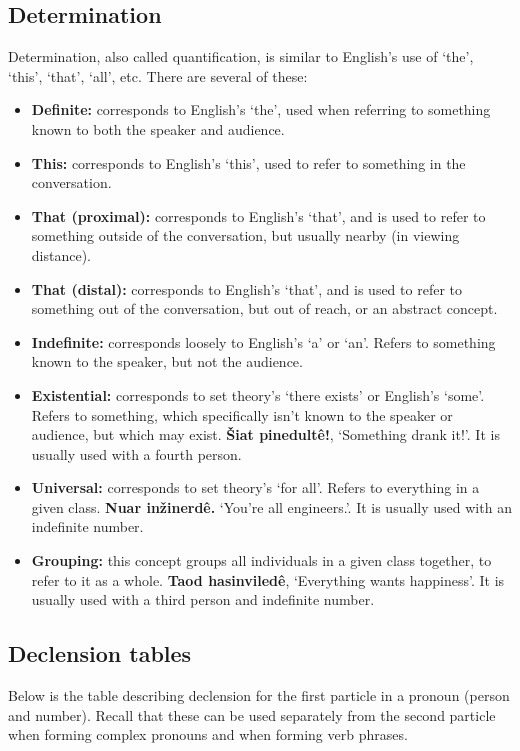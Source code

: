 \documentclass[12pt]{report}
\begin{document}
\subsection{Determination}
Determination, also called quantification, is similar to English's use of `the', `this', `that', `all', etc. There are several of these:

\begin{itemize}
\item \textbf{Definite:} corresponds to English's `the', used when referring to something known to both the speaker and audience.
\item \textbf{This:} corresponds to English's `this', used to refer to something in the conversation.
\item \textbf{That (proximal):} corresponds to English's `that', and is used to refer to something outside of the conversation, but usually nearby (in viewing distance).
\item \textbf{That (distal):} corresponds to English's `that', and is used to refer to something out of the conversation, but out of reach, or an abstract concept.
\item \textbf{Indefinite:} corresponds loosely to English's `a' or `an'. Refers to something known to the speaker, but not the audience.
\item \textbf{Existential:} corresponds to set theory's `there exists' or English's `some'. Refers to something, which specifically isn't known to the speaker or audience, but which may exist. \textbf{\v Siat pinedult\^ e!}, `Something drank it!'. It is usually used with a fourth person. 
\item \textbf{Universal:} corresponds to set theory's `for all'. Refers to everything in a given class. \textbf{Nuar in\v zinerd\^e.} `You're all engineers.'. It is usually used with an indefinite number.
\item \textbf{Grouping:} this concept groups all individuals in a given class together, to refer to it as a whole. \textbf{Taod hasinviled\^ e}, `Everything wants happiness'. It is usually used with a third person and indefinite number.
\end{itemize}

\subsection{Declension tables}
Below is the table describing declension for the first particle in a pronoun (person and number). Recall that these can be used separately from the second particle when forming complex pronouns and when forming verb phrases. 
\vspace{5mm}
\end{document}
